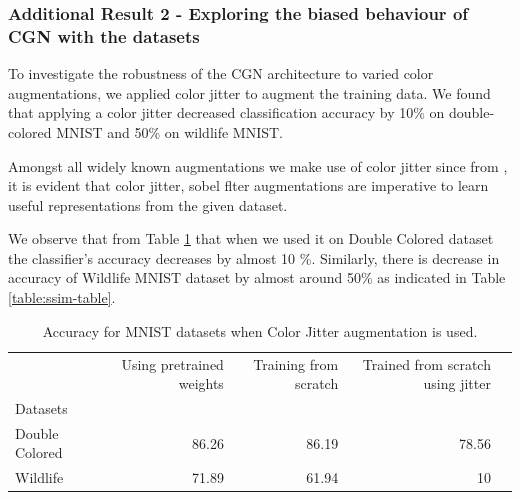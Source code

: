 \subsubsection{Additional Result 2 - Exploring the biased behaviour of CGN\cite{sauer2021counterfactual} with the datasets}


To investigate the robustness of the CGN architecture \cite{sauer2021counterfactual} to varied color augmentations, we applied color jitter to augment the training data. We found that applying a color jitter decreased classification accuracy by 10\% on double-colored MNIST and 50\% on wildlife MNIST.


Amongst all widely known augmentations we make use of color jitter since from \cite{chen2020simple}, \cite{he2020momentum} it is evident that color jitter, sobel flter augmentations are imperative to learn useful representations from the given dataset. 

We observe that from Table \ref{table:colorjitter-table} that when we used it on Double Colored dataset the classifier's accuracy decreases by almost 10 \%. Similarly, there is decrease in accuracy of Wildlife MNIST dataset by almost around 50\% as indicated in Table \ref{table:ssim-table}. 


 


\begin{table}[h]
\centering
\tiny
\begin{tabular}{lrrrr}
\toprule
{} & Using pretrained weights &  Training from scratch & Trained from scratch using jitter\\
Datasets  &              &              &                            \\
\midrule
Double Colored              &        86.26  &        86.19 &         78.56  \\
Wildlife              &        71.89 &        61.94 &         10  \\
\bottomrule
\end{tabular}
\caption{Accuracy for MNIST datasets when Color Jitter augmentation is used.   }
\label{table:colorjitter-table}
\end{table}


